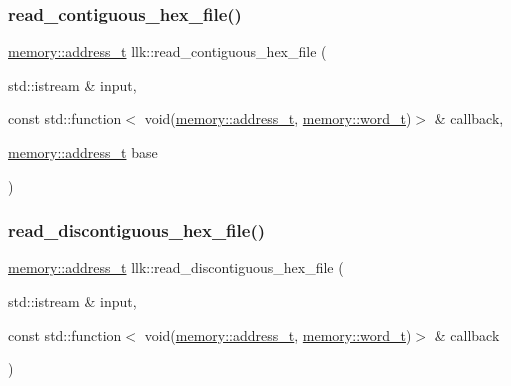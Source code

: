 \mbox{\label{namespacellk_a990d22b32661648e11a518ee5ce97f59}} 
\subsubsection{\texorpdfstring{read\+\_\+contiguous\+\_\+hex\+\_\+file()}{read\_contiguous\_hex\_file()}\hspace{0.1cm}{\footnotesize\ttfamily [2/2]}}
{\footnotesize\ttfamily \hyperlink{classllk_1_1memory_ae7a4b897aa999f22e250dc8e4d773dec}{memory\+::address\+\_\+t} llk\+::read\+\_\+contiguous\+\_\+hex\+\_\+file (\begin{DoxyParamCaption}\item[{std\+::istream \&}]{input,  }\item[{const std\+::function$<$ void(\hyperlink{classllk_1_1memory_ae7a4b897aa999f22e250dc8e4d773dec}{memory\+::address\+\_\+t}, \hyperlink{classllk_1_1memory_a432a6c0ae1bcb9c44d79cfa1a239419c}{memory\+::word\+\_\+t})$>$ \&}]{callback,  }\item[{\hyperlink{classllk_1_1memory_ae7a4b897aa999f22e250dc8e4d773dec}{memory\+::address\+\_\+t}}]{base }\end{DoxyParamCaption})}

\mbox{\label{namespacellk_a8727be2796e20502d8401b0bd7090a31}} 
\subsubsection{\texorpdfstring{read\+\_\+discontiguous\+\_\+hex\+\_\+file()}{read\_discontiguous\_hex\_file()}}
{\footnotesize\ttfamily \hyperlink{classllk_1_1memory_ae7a4b897aa999f22e250dc8e4d773dec}{memory\+::address\+\_\+t} llk\+::read\+\_\+discontiguous\+\_\+hex\+\_\+file (\begin{DoxyParamCaption}\item[{std\+::istream \&}]{input,  }\item[{const std\+::function$<$ void(\hyperlink{classllk_1_1memory_ae7a4b897aa999f22e250dc8e4d773dec}{memory\+::address\+\_\+t}, \hyperlink{classllk_1_1memory_a432a6c0ae1bcb9c44d79cfa1a239419c}{memory\+::word\+\_\+t})$>$ \&}]{callback }\end{DoxyParamCaption})}


